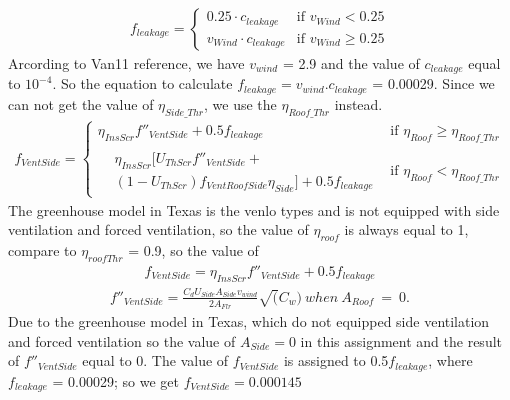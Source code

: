 \documentclass[a4paper]{article}
\numberwithin{equation}{section}
\begin{document}
\begin{itemize}
\begin{align*}
  f_{leakage} = \begin{cases}
    0.25 \cdot c_{leakage}     & \text{if~} v_{Wind} < 0.25    \\
    v_{Wind} \cdot c_{leakage} & \text{if~} v_{Wind} \geq 0.25
  \end{cases}
\end{align*}
Arcording to Van11 reference, we have $v_{wind}$ = 2.9 and the value of $c_{leakage}$ equal to $10^{-4}$. So the equation to calculate $f_{leakage} = v_{wind}.c_{leakage}$ = 0.00029. Since we can not get the value of $\eta_{Side\_Thr}$, we use the $\eta_{Roof\_Thr}$ instead.
\begin{gather*}
  f_{VentSide} =
  \begin{cases}
    \eta_{InsScr} f''_{VentSide} + 0.5f_{leakage} & \text{if~} \eta_{Roof} \geq \eta_{Roof\_Thr} \\
    \begin{split}
      & \eta_{InsScr} [U_{ThScr}f''_{VentSide} + \\
      & (1-U_{ThScr})f_{VentRoofSide} \eta_{Side}] + 0.5 f_{leakage}
    \end{split}                    & \text{if~}  \eta_{Roof} < \eta_{Roof\_Thr}
  \end{cases}
\end{gather*}
The greenhouse model in Texas is the venlo types and is not equipped with side ventilation and forced ventilation, so the value of $\eta_{roof}$ is always equal to 1, compare to $\eta_{roofThr}$ = 0.9, so the value of\\
\begin{align*}
    f_{VentSide} = \eta_{InsScr} f''_{VentSide} + 0.5f_{leakage}
\end{align*}
\begin{align*}
f''_{VentSide} = \frac{C_d U_{Side} A_{Side}v_{wind}}{2A_{Flr}}\sqrt(C_w) ~ when ~A_{Roof} ~= ~0.
\end{align*}
Due to the greenhouse model in Texas, which do not equipped side ventilation and forced ventilation so the value of $A_{Side}=0$ in this assignment and the result of $f''_{VentSide}$ equal to 0.
The value of $f_{VentSide}$ is assigned to 0.5$f_{leakage}$, where $f_{leakage}$ = 0.00029; so we get $f_{VentSide} = 0.000145$ 


\end{itemize}
\end{document}
